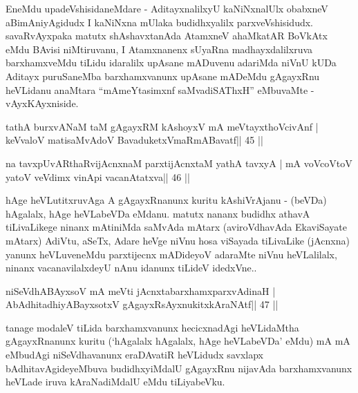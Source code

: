 \begin{artha}
EneMdu upadeVshisidaneMdare - AditayxnalilxyU kaNiNxnalUlx obabxneV 
aBimAni\-yAgidudx I kaNiNxna mUlaka budidhxyalilx parxveVshisidudx. 
savaRvAyxpaka matutx shAshavxtanAda AtamxneV ahaMkatAR BoVkAtx eMdu 
BAvisi niMtiruvanu, I Atamxnanenx sUyaRna madhayxdalilxruva 
barxhamxveMdu tiLidu idaralilx upAsane mADuvenu adariMda niVnU kUDa 
Aditayx puruSaneMba barxhamxvanunx upAsane mADeMdu gAgayxRnu heVLidanu 
anaMtara ``mAmeYtasimxnf saMvadiSAThxH'' eMbuvaMte - vAyxKAyxniside.
\end{artha}

\begin{shl}
tathA burxvANaM taM gAgayxRM kAshoyxV mA meVtayxthoVcivAnf |
keVvaloV matisaMvAdoV BavaduketxVmaRmABavatf\hfill || 45 ||
\end{shl}

\begin{shl}
na tavxpUvARthaRvijAcnxnaM parxtijAcnxtaM yathA tavxyA |
mA voVcoV\s toV yatoV veVdimx vinA\s pi vacanAtatxva\hfill || 46 ||
\end{shl}

\begin{artha}
hAge heVLutitxruvAga A gAgayxRnanunx kuritu kAshiVrAjanu - (beVDa)  hAgalalx, hAge heVLabeVDa eMdanu. matutx nananx budidhx athavA  tiLivaLikege ninanx mAtiniMda saMvAda mAtarx (aviroVdhavAda EkaviSayate mAtarx) AdiVtu, aSeTx, Adare heVge niVnu hosa viSayada tiLivaLike (jAcnxna) yanunx heVLuveneMdu parxtijecnx mADideyoV adaraMte niVnu heVLalilalx, ninanx vacanavilalxdeyU nAnu idanunx tiLideV idedxVne..
\end{artha}


\begin{shl}
niSeVdhABAyxsoV mA meVti jAcnxtabarxhamxparxvAdinaH |
AbAdhitadhiyA\s BayxsotxV gAgayxRsAyxnukitxkAraNAtf\hfill || 47 ||
\end{shl}

\begin{artha}
tanage modaleV  tiLida barxhamxvanunx hecicxnadAgi heVLidaMtha  gAgayxRnanunx kuritu (`hAgalalx hAgalalx, hAge heVLabeVDa' eMdu) mA mA  eMbudAgi niSeVdhavanunx eraDAvatiR heVLidudx savxlapx  bAdhitavAgideyeMbuva budidhxyiMdalU gAgayxRnu nijavAda barxhamxvanunx heVLade iruva kAraNadiMdalU eMdu tiLiyabeVku.
\end{artha}



